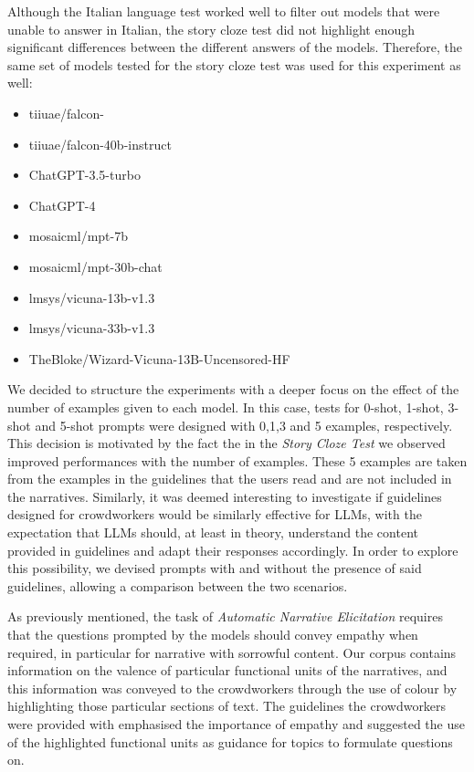 Although the Italian language test worked well to filter out models that were unable to answer in Italian, the story cloze test did not highlight enough significant differences between the different answers of the models.
Therefore, the same set of models tested for the story cloze test was used for this experiment as well:
\begin{itemize}
    \item   tiiuae/falcon- \cite{falcon40b}
    \item   tiiuae/falcon-40b-instruct \cite{falcon40b}
    \item   ChatGPT-3.5-turbo \cite{chatgpt}
    \item   ChatGPT-4 \cite{openai2023gpt4}
    \item   mosaicml/mpt-7b \cite{mpt7b}
    \item   mosaicml/mpt-30b-chat \cite{mpt30b}
    \item   lmsys/vicuna-13b-v1.3 \cite{touvronllama}
    \item   lmsys/vicuna-33b-v1.3 \cite{touvronllama}
    \item   TheBloke/Wizard-Vicuna-13B-Uncensored-HF \cite{wizard-vicuna}
\end{itemize}
We decided to structure the experiments with a deeper focus on the effect of the number of examples given to each model. In this case, tests for 0-shot, 1-shot, 3-shot and 5-shot prompts were designed with 0,1,3 and 5 examples, respectively. This decision is motivated by the fact the in the \emph{Story Cloze Test} we observed improved performances with the number of examples. These 5 examples are taken from the examples in the guidelines that the users read and are not included in the narratives. Similarly, it was deemed interesting to investigate if guidelines designed for crowdworkers would be similarly effective for LLMs, with the expectation that LLMs should, at least in theory, understand the content provided in guidelines and adapt their responses accordingly. In order to explore this possibility, we devised prompts with and without the presence of said guidelines, allowing a comparison between the two scenarios.

As previously mentioned, the task of \emph{Automatic Narrative Elicitation} requires that the questions prompted by the models should convey empathy when required, in particular for narrative with sorrowful content. Our corpus contains information on the valence of particular functional units of the narratives, and this information was conveyed to the crowdworkers through the use of colour by highlighting those particular sections of text. The guidelines the crowdworkers were provided with emphasised the importance of empathy and suggested the use of the highlighted functional units as guidance for topics to formulate questions on. 


